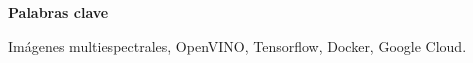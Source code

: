 
\vspace{0.8cm}
\begin{center}


{\bf \Large Palabras clave}

\end{center}

Imágenes multiespectrales, OpenVINO, Tensorflow, Docker, Google Cloud.

\vspace{0.3cm}